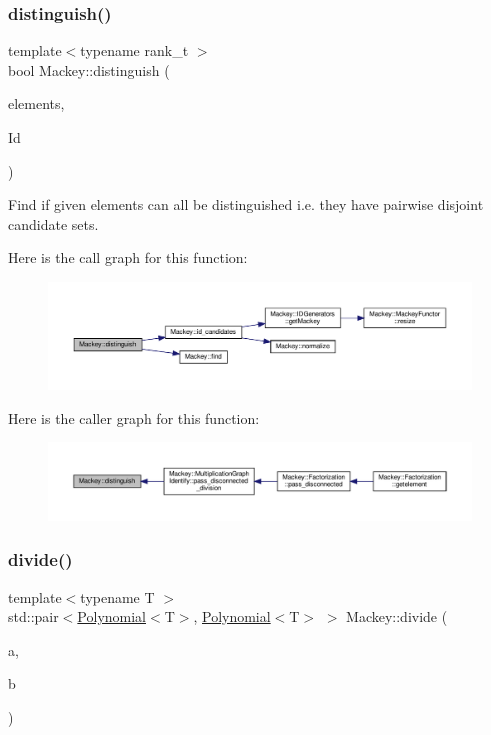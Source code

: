 \subsubsection{\texorpdfstring{distinguish()}{distinguish()}}
{\footnotesize\ttfamily template$<$typename rank\+\_\+t $>$ \\
bool Mackey\+::distinguish (\begin{DoxyParamCaption}\item[{const std\+::vector$<$ rank\+\_\+t $>$ \&}]{elements,  }\item[{const \hyperlink{classMackey_1_1IDGenerators}{I\+D\+Generators}$<$ rank\+\_\+t $>$ \&}]{Id }\end{DoxyParamCaption})}



Find if given elements can all be distinguished i.\+e. they have pairwise disjoint candidate sets. 

Here is the call graph for this function\+:\nopagebreak
\begin{figure}[H]
\begin{center}
\leavevmode
\includegraphics[width=350pt]{namespaceMackey_a281b9be315d7d51c7e691d4c733ac0c9_cgraph}
\end{center}
\end{figure}
Here is the caller graph for this function\+:\nopagebreak
\begin{figure}[H]
\begin{center}
\leavevmode
\includegraphics[width=350pt]{namespaceMackey_a281b9be315d7d51c7e691d4c733ac0c9_icgraph}
\end{center}
\end{figure}
\mbox{\label{namespaceMackey_a04fadcf186ab504cafeb259178ee4827}} 
\subsubsection{\texorpdfstring{divide()}{divide()}}
{\footnotesize\ttfamily template$<$typename T $>$ \\
std\+::pair$<$\hyperlink{classMackey_1_1Polynomial}{Polynomial}$<$T$>$, \hyperlink{classMackey_1_1Polynomial}{Polynomial}$<$T$>$ $>$ Mackey\+::divide (\begin{DoxyParamCaption}\item[{const \hyperlink{classMackey_1_1Polynomial}{Polynomial}$<$ T $>$ \&}]{a,  }\item[{const \hyperlink{classMackey_1_1Polynomial}{Polynomial}$<$ T $>$ \&}]{b }\end{DoxyParamCaption})}

